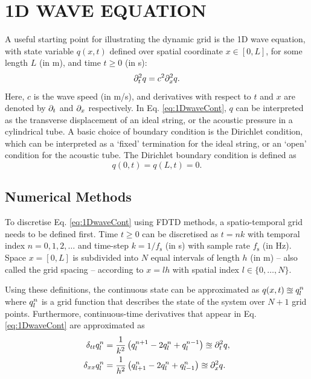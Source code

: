 \documentclass[fleqn]{jaes}
\begin{document}
\section{1D WAVE EQUATION}\label{sec:continuous}
A useful starting point for illustrating the dynamic grid is the 1D wave equation, with state variable $q(x, t)$ defined over spatial coordinate $x \in [0, L]$, for some length $L$ (in m), and time $t \geq 0$ (in s):
\begin{equation}\label{eq:1DwaveCont}
    \ptt q = c^2 \pxx q.
\end{equation}
Here, $c$ is the wave speed (in m/s), and derivatives with respect to $t$ and $x$ are denoted by $\partial_t$ and $\partial_x$ respectively. In Eq. \eqref{eq:1DwaveCont}, $q$ can be interpreted as the transverse displacement of an ideal string, or the acoustic pressure in a cylindrical tube. A basic choice of boundary condition is the Dirichlet condition, which can be interpreted as a `fixed' termination for the ideal string, or an `open' condition for the acoustic tube. The Dirichlet boundary condition is defined as
\begin{equation}
    q(0, t) = q(L, t) = 0.\label{eq:contDirichlet}
\end{equation}
\subsection{Numerical Methods}\label{sec:numericalMethods}
To discretise Eq. \eqref{eq:1DwaveCont} using FDTD methods, a spatio-temporal grid needs to be defined first. 
Time $t\geq 0$ can be discretised as $t = nk$ with temporal index $n = 0, 1, 2, \hdots$ and time-step $k = 1/f_\text{s}$ (in s) with sample rate $f_\text{s}$ (in Hz). Space $x = [0, L]$ is subdivided into $N$ equal intervals of length $h$ (in m) -- also called the grid spacing -- according to $x = lh$ with spatial index $l\in \{0, \hdots, N\}$. 

Using these definitions, the continuous state can be approximated as $q(x,t) \approxeq q_l^n$ where $q_l^n$ is a grid function that describes the state of the system over $N+1$ grid points. Furthermore, continuous-time derivatives that appear in Eq. \eqref{eq:1DwaveCont} are approximated as
\begin{subequations}{\label{eq:FDoperators}}
\begin{align}
    \dtt \qln &= \frac{1}{k^2}\left(q_l^{n+1} - 2 \qln + q_l^{n-1}\right)\approxeq\ptt q  ,\\
    \dxx \qln &= \frac{1}{h^2}\left(q_{l+1}^n - 2 \qln + q_{l-1}^n\right)\approxeq \pxx q .
\end{align}
\end{subequations}
\end{document}
